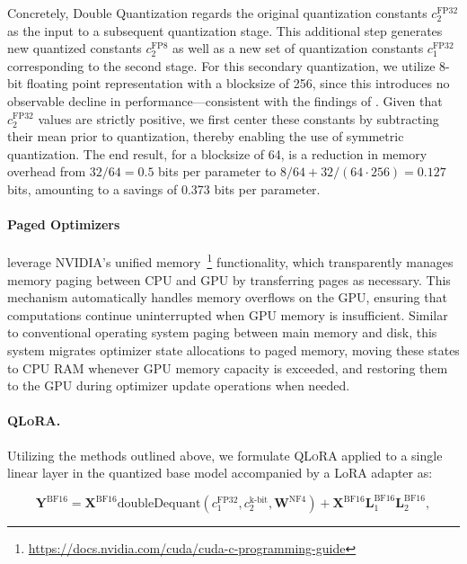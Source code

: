 Concretely, Double Quantization regards the original quantization constants $c_2^{\text{FP32}}$ as the input to a subsequent quantization stage. This additional step generates new quantized constants $c_2^{\text{FP8}}$ as well as a new set of quantization constants $c_1^{\text{FP32}}$ corresponding to the second stage. For this secondary quantization, we utilize 8-bit floating point representation with a blocksize of 256, since this introduces no observable decline in performance—consistent with the findings of \citet{dettmers2022case}. Given that $c_2^{\text{FP32}}$ values are strictly positive, we first center these constants by subtracting their mean prior to quantization, thereby enabling the use of symmetric quantization. The end result, for a blocksize of 64, is a reduction in memory overhead from $32/64=0.5$ bits per parameter to $8/64 + 32/(64\cdot256) = 0.127$ bits, amounting to a savings of 0.373 bits per parameter.

\paragraph{Paged Optimizers} leverage NVIDIA's unified memory~\footnote{\tiny \url{https://docs.nvidia.com/cuda/cuda-c-programming-guide}} functionality, which transparently manages memory paging between CPU and GPU by transferring pages as necessary. This mechanism automatically handles memory overflows on the GPU, ensuring that computations continue uninterrupted when GPU memory is insufficient. Similar to conventional operating system paging between main memory and disk, this system migrates optimizer state allocations to paged memory, moving these states to CPU RAM whenever GPU memory capacity is exceeded, and restoring them to the GPU during optimizer update operations when needed.

\paragraph{\textsc{QLoRA}.} Utilizing the methods outlined above, we formulate \textsc{QLoRA} applied to a single linear layer in the quantized base model accompanied by a LoRA adapter as:

\begin{equation}
    \mathbf{Y}^{\text{BF16}} =  \mathbf{X}^{\text{BF16}} \text{doubleDequant}(c_1^{\text{FP32}}, c_2^{\text{k-bit}}, \mathbf{W}^{\text{NF4}}) + \mathbf{X}^{\text{BF16}}\mathbf{L}^{\text{BF16}}_1\mathbf{L}^{\text{BF16}}_2,
\end{equation}

